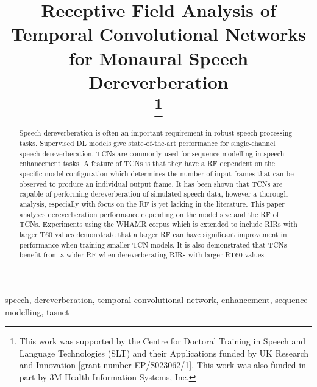 \documentclass[conference,a4paper]{IEEEtran}
\begin{document}
\title{Receptive Field Analysis of Temporal Convolutional Networks for Monaural Speech Dereverberation\\
\thanks{{This work was supported by the Centre for Doctoral Training in Speech and Language Technologies (SLT) and their Applications funded by UK Research and Innovation [grant number EP/S023062/1].} {This work was also funded in part by 3M Health Information Systems, Inc.}}
}

\author{

}

\maketitle

\begin{abstract}
Speech dereverberation is often an important requirement in robust speech processing tasks. Supervised \ac{DL} models give 
{state-of-the-art} performance for 
{single-channel } speech dereverberation. 
{\Acp{TCN} are}
commonly used for sequence modelling in speech enhancement tasks. A feature of \ac{TCN}s is that they have a \ac{RF} dependent on the specific model configuration which determines the number of input frames that can be observed to produce an individual output frame. It has been shown that \ac{TCN}s are capable of performing dereverberation of simulated speech data, however a thorough analysis{, especially with focus on the \ac{RF} is yet lacking in the literature.}
This paper 
{analyses dereverberation performance depending on} 
the model size and the \ac{RF} of 
{\acp{TCN}.}
{Experiments} using the WHAMR corpus which is extended to include \acp{RIR} with larger T60 values
{demonstrate} 
that a larger \ac{RF} can have significant improvement in performance when training smaller \ac{TCN} models.
It is also demonstrated that \ac{TCN}s benefit from a wider \ac{RF} when dereverberating \acp{RIR} with larger RT60 values. 
\end{abstract}

\begin{IEEEkeywords}
speech, dereverberation, temporal convolutional network, enhancement, sequence modelling, tasnet
\end{IEEEkeywords}
\end{document}
